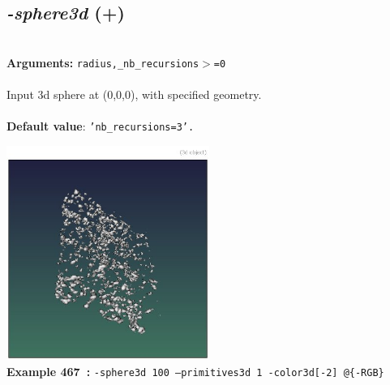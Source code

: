 \documentclass[a4paper,11pt,twoside]{book}
\begin{document}
\subsection{\emph{-sphere3d} (+)}\vspace*{-0.5em}
~\\\textbf{Arguments: } 
{\small \texttt{radius,\_nb\_recursions$>$=0}}\\~\\
Input 3d sphere at (0,0,0), with specified geometry.
~\\~\\\textbf{Default value}: {\small \texttt{'nb\_recursions=3'.}}
\begin{center}\includegraphics[keepaspectratio=true,height=7cm,width=\textwidth]{img/gmic_def467.jpg}\\
{\footnotesize \textbf{Example 467~:} \texttt{-sphere3d 100 --primitives3d 1  -color3d[-2] @\{-RGB\}}}
\end{center}
\end{document}
